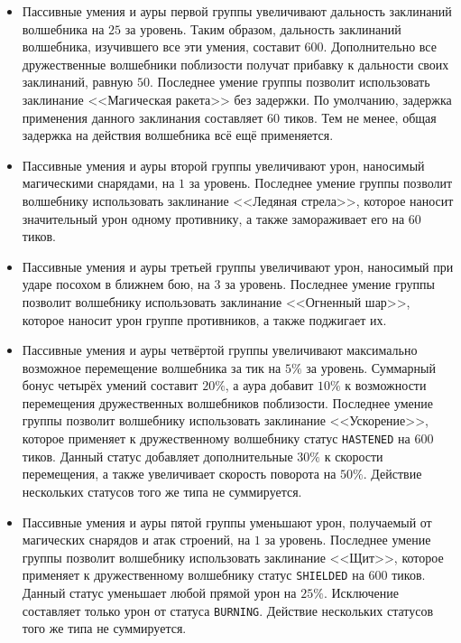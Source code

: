 \begin{itemize}
    \item Пассивные умения и ауры первой группы увеличивают дальность заклинаний волшебника на $25$ за уровень. Таким образом, дальность
          заклинаний волшебника, изучившего все эти умения, составит $600$. Дополнительно все дружественные волшебники поблизости получат
          прибавку к дальности своих заклинаний, равную $50$. Последнее умение группы позволит использовать заклинание <<Магическая ракета>>
          без задержки. По умолчанию, задержка применения данного заклинания составляет $60$ тиков. Тем не менее, общая задержка на действия
          волшебника всё ещё применяется.
    \item Пассивные умения и ауры второй группы увеличивают урон, наносимый магическими снарядами, на $1$ за уровень. Последнее умение
          группы позволит волшебнику использовать заклинание <<Ледяная стрела>>, которое наносит значительный урон одному противнику, а
          также замораживает его на $60$ тиков.
    \item Пассивные умения и ауры третьей группы увеличивают урон, наносимый при ударе посохом в ближнем бою, на $3$ за уровень. Последнее
          умение группы позволит волшебнику использовать заклинание <<Огненный шар>>, которое наносит урон группе противников, а также
          поджигает их.
    \item Пассивные умения и ауры четвёртой группы увеличивают максимально возможное перемещение волшебника за тик на $5\%$ за уровень.
          Суммарный бонус четырёх умений составит $20\%$, а аура добавит $10\%$ к возможности перемещения дружественных волшебников
          поблизости. Последнее умение группы позволит волшебнику использовать заклинание <<Ускорение>>, которое применяет к дружественному
          волшебнику статус \texttt{HASTENED} на $600$ тиков. Данный статус добавляет дополнительные $30\%$ к скорости перемещения, а также
          увеличивает скорость поворота на $50\%$. Действие нескольких статусов того же типа не суммируется.
    \item Пассивные умения и ауры пятой группы уменьшают урон, получаемый от магических снарядов и атак строений, на $1$ за уровень.
          Последнее умение группы позволит волшебнику использовать заклинание <<Щит>>, которое применяет к дружественному волшебнику статус
          \texttt{SHIELDED} на $600$ тиков. Данный статус уменьшает любой прямой урон на $25\%$. Исключение составляет только урон от
          статуса \texttt{BURNING}. Действие нескольких статусов того же типа не суммируется.
\end{itemize}


